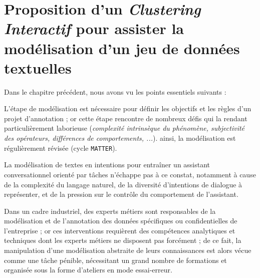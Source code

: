 \chapter[
	Proposition d'un \textit{Clustering Interactif}
]{
	Proposition d'un \textit{Clustering Interactif} pour assister la modélisation d'un jeu de données textuelles
}
\label{chapter:3-CLUSTERING-INTERACTIF}
	
	Dans le chapitre précédent, nous avons vu les points essentiels suivants :
	\begin{leftBarImportantGreen}
		\begin{todolist}
			\item[\itemok] L'étape de modélisation est nécessaire pour définir les objectifs et les règles d'un projet d'annotation ;
			or cette étape rencontre de nombreux défis qui la rendant particulièrement laborieuse (\textit{complexité intrinsèque du phénomène, subjectivité des opérateurs, différences de comportements, ...}).
			ainsi, la modélisation est régulièrement révisée (cycle \texttt{MATTER}).
			\item[\itemok] La modélisation de textes en intentions pour entraîner un assistant conversationnel orienté par tâches n'échappe pas à ce constat, notamment à cause de la complexité du langage naturel, de la diversité d'intentions de dialogue à représenter, et de la pression sur le contrôle du comportement de l'assistant.
			\item[\itemok] Dans un cadre industriel, des experts métiers sont responsables de la modélisation et de l'annotation des données spécifiques ou confidentielles de l'entreprise ;
			or ces interventions requièrent des compétences analytiques et techniques dont les experts métiers ne disposent pas forcément ;
			de ce fait, la manipulation d'une modélisation abstraite de leurs connaissances est alors vécue comme une tâche pénible, nécessitant un grand nombre de formations et organisée sous la forme d'ateliers en mode essai-erreur.
		\end{todolist}
	\end{leftBarImportantGreen}
	
